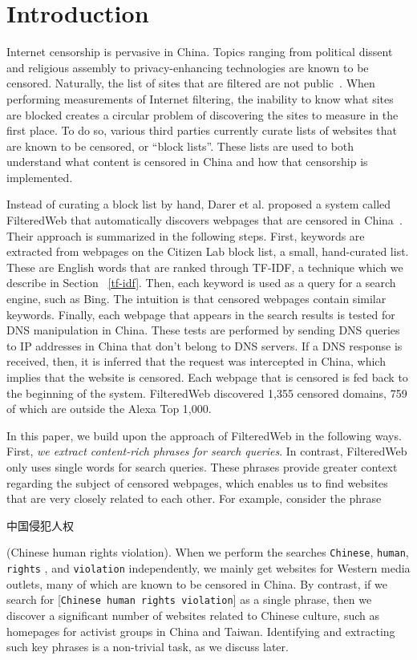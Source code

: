 
\section{Introduction} 

Internet censorship is pervasive in China. Topics ranging from political
dissent and religious assembly to privacy-enhancing technologies are known to
be censored. Naturally, the list of sites that are filtered are not
public~\cite{fhouse:china}. When performing measurements of Internet
filtering, the inability to know what sites are blocked creates a circular
problem of discovering the sites to measure in the first place. To do so, various
third parties currently curate
lists of websites that are known to be censored, or ``block lists''. These
lists are used to both understand {what} content is censored in China and
how that censorship is implemented.

Instead of curating a block list by hand, Darer et al. proposed a
system called FilteredWeb that automatically discovers webpages that
are censored in China~\cite{darer2017filteredweb}. Their approach is
summarized in the following steps. First, keywords are extracted from
webpages on the Citizen Lab block list, a small, hand-curated
list. These are English words that are ranked through TF-IDF, a
technique which we describe in Section ~\ref{tf-idf}. Then, each
keyword is used as a query for a search engine, such as Bing. The
intuition is that censored webpages contain similar keywords. Finally,
each webpage that appears in the search results is tested for DNS
manipulation in China. These tests are performed by sending DNS
queries to IP addresses in China that don't belong to DNS servers. If
a DNS response is received, then, it is inferred that the request was
intercepted in China, which implies that the website is censored. Each
webpage that is censored is fed back to the beginning of the
system. FilteredWeb discovered 1,355 censored domains, 759 of which
are outside the Alexa Top 1,000.

In this paper, we build upon the approach of FilteredWeb in the
following ways. First, {\em we extract content-rich phrases
for search queries}. In contrast, FilteredWeb only uses single words
for search queries. These phrases provide greater context regarding
the subject of censored webpages, which enables us to find websites
that are very closely related to each other. For example, consider the
phrase \begin{CJK*}{UTF8}{gbsn}中国侵犯人权 \end{CJK*} (Chinese human
rights violation). When we perform the searches \texttt{Chinese},
\texttt{human}, \texttt{rights} , and \texttt{violation}
independently, we mainly get websites for Western media outlets, many
of which are known to be censored in China. By contrast, if we search
for [\texttt{Chinese human rights violation}] as a single phrase, then
we discover a significant number of websites related to Chinese
culture, such as homepages for activist groups in China and
Taiwan. Identifying and extracting such key phrases is a non-trivial
task, as we discuss later.

